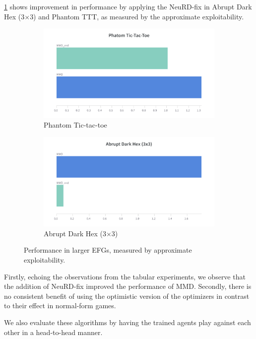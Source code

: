 

\ref{fig:neural2} shows improvement in performance by applying the NeuRD-fix in Abrupt Dark Hex
(3$\times$3) and Phantom TTT, as measured by the approximate exploitability.
\begin{figure}[H]
	\centering
	\begin{subfigure}[b]{0.4\textwidth}
		\includegraphics[width=\textwidth]{figs/pttt.png}
		\caption{Phantom Tic-tac-toe}
	\end{subfigure}
	\begin{subfigure}[b]{0.4\textwidth}
		\includegraphics[width=\textwidth]{figs/ahex33.png}
		\caption{Abrupt Dark Hex (3$\times$3)}
	\end{subfigure}
	\caption{Performance in larger EFGs, measured by approximate exploitability.}
	\label{fig:neural2}
\end{figure}

Firstly, echoing the observations from the tabular experiments, we observe that the addition of
NeuRD-fix improved the performance of MMD.
Secondly, there is no consistent benefit of using the optimistic version of the optimizers in
contrast to their effect in normal-form games.

We also evaluate these algorithms by having the trained agents play against each other in a
head-to-head manner.

